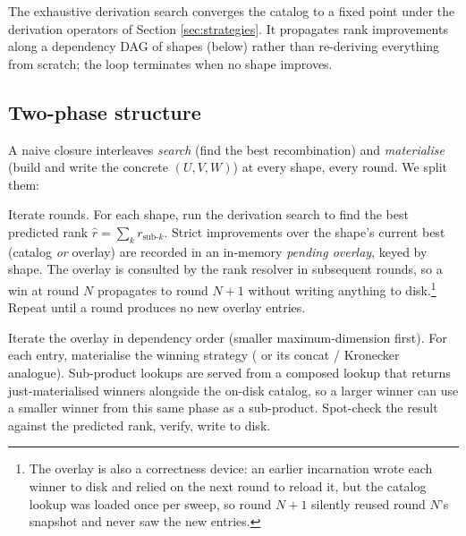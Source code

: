 
The exhaustive derivation search converges the catalog to a fixed point
under the derivation operators of Section \ref{sec:strategies}. It
propagates rank improvements along a dependency DAG of shapes
(below) rather than re-deriving everything from scratch; the loop
terminates when no shape improves.

\subsection{Two-phase structure}

A naive closure interleaves \emph{search} (find the best
recombination) and \emph{materialise} (build and write the concrete
\((U, V, W)\)) at every shape, every round. We split them:

\begin{description}[itemsep=2pt]
  \item[Phase 1 -- Search.] Iterate rounds. For each shape, run the
    derivation search to find the best predicted rank
    \(\hat r = \sum_k r_{\text{sub-}k}\). Strict improvements over the
    shape's current best (catalog \emph{or} overlay) are recorded in
    an in-memory \emph{pending overlay}, keyed by shape. The overlay
    is consulted by the rank resolver in subsequent rounds, so a win
    at round \(N\) propagates to round \(N+1\) without writing
    anything to disk.\footnote{The overlay is also a correctness
    device: an earlier incarnation wrote each winner to disk and
    relied on the next round to reload it, but the catalog lookup was
    loaded once per sweep, so round \(N{+}1\) silently reused round
    \(N\)'s snapshot and never saw the new entries.} Repeat until a
    round produces no new overlay entries.
  \item[Phase 2 -- Materialise.] Iterate the overlay in
    dependency order (smaller maximum-dimension first). For each
    entry, materialise the winning strategy
    ( or its concat /
    Kronecker analogue). Sub-product lookups are served from a
    composed lookup that returns just-materialised winners alongside
    the on-disk catalog, so a larger winner can use a smaller winner
    from this same phase as a sub-product. Spot-check the result
    against the predicted rank, verify, write to disk.
\end{description}

